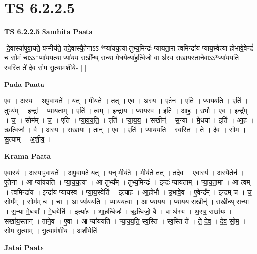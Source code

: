 \documentclass[17pt]{extarticle}
\begin{document}
\section{ TS 6.2.2.5 }

\textbf{TS 6.2.2.5 } \newline
\textbf{Samhita Paata} \newline

-दे॒वास्या॑पुवा॒यते॒ यन्मीय॑ते॒-तदे॒वास्यै॒तेनाऽऽ *प्या॑यय॒त्या तुभ्य॒मिन्द्रः॑ प्यायता॒मा त्वमिन्द्रा॑य प्याय॒स्वेत्या॑-हो॒भावे॒वेन्द्रं॑ च॒ सोमं॒ चाऽऽ*प्या॑यय॒त्या प्या॑यय॒ सखी᳚न्थ् स॒न्या मे॒धयेत्या॑ह॒र्त्विजो॒ वा अ॑स्य॒ सखा॑य॒स्ताने॒वाऽऽ*प्या॑ययति स्व॒स्ति ते॑ देव सोम सु॒त्याम॑शी॒ये- [  ] \newline

\textbf{Pada Paata} \newline

ए॒व । अ॒स्य॒ । अ॒पु॒वा॒यते᳚ । यत् । मीय॑ते । तत् । ए॒व । अ॒स्य॒ । ए॒तेन॑ । एति॑ । प्या॒य॒य॒ति॒ । एति॑ । तुभ्य᳚म् । इन्द्रः॑ । प्या॒य॒ता॒म् । एति॑ । त्वम् । इन्द्रा॑य । प्या॒य॒स्व॒ । इति॑ । आ॒ह॒ । उ॒भौ । ए॒व । इन्द्र᳚म् । च॒ । सोम᳚म् । च॒ । एति॑ । प्या॒य॒य॒ति॒ । एति॑ । प्या॒य॒य॒ । सखीन्॑ । स॒न्या । मे॒धया᳚ । इति॑ । आ॒ह॒ । ऋ॒त्विजः॑ । वै । अ॒स्य॒ । सखा॑यः । तान् । ए॒व । एति॑ । प्या॒य॒य॒ति॒ । स्व॒स्ति । ते॒ । दे॒व॒ । सो॒म॒ । सु॒त्याम् । अ॒शी॒य॒ ।  \newline


\textbf{Krama Paata} \newline

ए॒वास्य॑ । अ॒स्या॒पु॒वा॒यते᳚ । अ॒पु॒वा॒यते॒ यत् । यन् मीय॑ते । मीय॑ते॒ तत् । तदे॒व । ए॒वास्य॑ । अ॒स्यै॒तेन॑ । ए॒तेना । आ प्या॑ययति । प्या॒य॒य॒त्या । आ तुभ्य᳚म् । तुभ्य॒मिन्द्रः॑ । इन्द्रः॑ प्यायताम् । प्या॒य॒ता॒मा । आ त्वम् । त्वमिन्द्रा॑य । इन्द्रा॑य प्यायस्व । प्या॒य॒स्वेति॑ । इत्या॑ह । आ॒हो॒भौ । उ॒भावे॒व । ए॒वेन्द्र᳚म् । इन्द्र॑म् च । च॒ सोम᳚म् । सोम॑म् च । चा । आ प्या॑ययति । प्या॒य॒य॒त्या । आ प्या॑यय । प्या॒य॒य॒ सखीन्॑ । सखी᳚न्थ् स॒न्या । स॒न्या मे॒धया᳚ । मे॒धयेति॑ । इत्या॑ह । आ॒ह॒र्त्विजः॑ । ऋ॒त्विजो॒ वै । वा अ॑स्य । अ॒स्य॒ सखा॑यः । सखा॑य॒स्तान् । ताने॒व । ए॒वा । आ प्या॑ययति । प्या॒य॒य॒ति॒ स्व॒स्ति । स्व॒स्ति ते᳚ । ते॒ दे॒व॒ । दे॒व॒ सो॒म॒ । सो॒म॒ सु॒त्याम् । सु॒त्याम॑शीय । अ॒शी॒येति॑ \newline

\textbf{Jatai Paata} \newline
\end{document}
